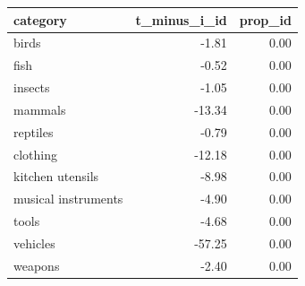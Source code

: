 \begin{table}[ht]
\centering
\begin{tabular}{lrr}
  \hline
category & t\_minus\_i\_id & prop\_id \\ 
  \hline
birds & -1.81 & 0.00 \\ 
  fish & -0.52 & 0.00 \\ 
  insects & -1.05 & 0.00 \\ 
  mammals & -13.34 & 0.00 \\ 
  reptiles & -0.79 & 0.00 \\ 
  clothing & -12.18 & 0.00 \\ 
  kitchen utensils & -8.98 & 0.00 \\ 
  musical instruments & -4.90 & 0.00 \\ 
  tools & -4.68 & 0.00 \\ 
  vehicles & -57.25 & 0.00 \\ 
  weapons & -2.40 & 0.00 \\ 
   \hline
\end{tabular}
\end{table}
